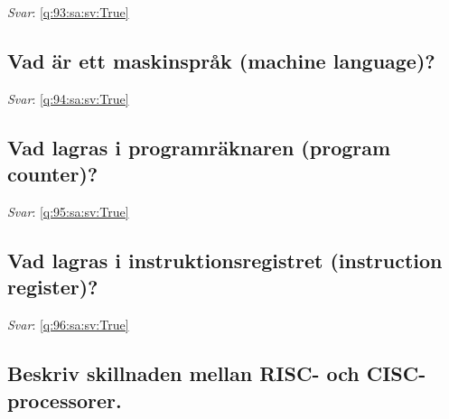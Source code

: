 \documentclass[a4paper,11pt,oneside]{article}
\begin{document}
\begin{sloppypar}
\vspace{2cm}

\noindent\makebox[\textwidth]{\hrulefill}

\vspace{1cm}

\textit{Svar}: \autoref{q:93:sa:sv:True}



\subsection{Vad \"ar ett maskinspr\r{a}k (machine language)?}

\label{q:94:sa:sv:False}

\vspace{2cm}

\noindent\makebox[\textwidth]{\hrulefill}

\vspace{1cm}

\textit{Svar}: \autoref{q:94:sa:sv:True}



\subsection{Vad lagras i programr\"aknaren (program counter)?}

\label{q:95:sa:sv:False}

\vspace{2cm}

\noindent\makebox[\textwidth]{\hrulefill}

\vspace{1cm}

\textit{Svar}: \autoref{q:95:sa:sv:True}



\subsection{Vad lagras i instruktionsregistret (instruction register)?}

\label{q:96:sa:sv:False}

\vspace{2cm}

\noindent\makebox[\textwidth]{\hrulefill}

\vspace{1cm}

\textit{Svar}: \autoref{q:96:sa:sv:True}



\subsection{Beskriv skillnaden mellan RISC- och CISC-processorer.}


\end{sloppypar}
\end{document}

